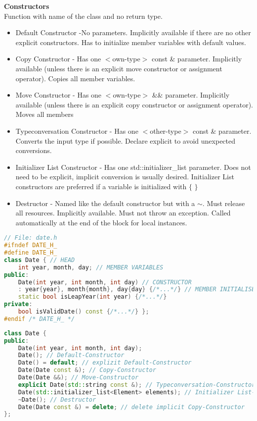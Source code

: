 \textbf{Constructors} \\
Function with name of the class and no return type. 
\begin{itemize}
    \item Default Constructor -No parameters. Implicitly available if there are no other explicit constructors. Has to initialize member variables with default values.
    \item Copy Constructor - Has one $<$own-type$>$ const \& parameter. Implicitly available (unless there is an explicit move constructor or assignment operator). Copies all member variables.
    \item Move Constructor - Has one $<$own-type$>$ \&\& parameter. Implicitly available (unless there is an explicit copy constructor or assignment operator). Moves all members
    \item Typeconversation Constructor - Has one $<$other-type$>$ const \& parameter. Converts the input type if possible. Declare explicit to avoid unexpected conversions.
    \item Initializer List Constructor - Has one std::initializer\_list parameter. Does not need to be explicit, implicit conversion is usually desired. Initializer List constructors are preferred if a variable is initialized with $\{$ $\}$
    \item Destructor - Named like the default constructor but with a $\sim$. Must release all resources. Implicitly available. Must not throw an exception. Called automatically at the end of the block for local instances.
\end{itemize}

\begin{lstlisting}[language=C++]
// File: date.h
#ifndef DATE_H_ 
#define DATE_H_
class Date { // HEAD
	int year, month, day; // MEMBER VARIABLES
public:
	Date(int year, int month, int day) // CONSTRUCTOR
	: year{year}, month{month}, day{day} {/*...*/} // MEMBER INITIALISER LIST
	static bool isLeapYear(int year) {/*...*/}
private:
	bool isValidDate() const {/*...*/} };
#endif /* DATE_H_ */
\end{lstlisting}

\begin{lstlisting}[language=C++]
class Date {
public:
    Date(int year, int month, int day);
    Date(); // Default-Constructor
    Date() = default; // explizit Default-Constructor
    Date(Date const &); // Copy-Constructor
    Date(Date &&); // Move-Constructor
    explicit Date(std::string const &); // Typeconversation-Constructor
    Date(std::initializer_list<Element> elements); // Initializer List-Constructor
    ~Date(); // Destructor
    Date(Date const &) = delete; // delete implicit Copy-Constructor
};
\end{lstlisting}

